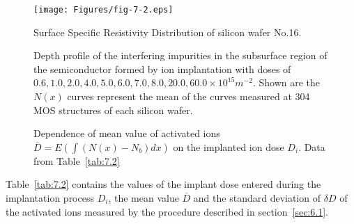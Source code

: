 \begin{figure}[h!]\centering
  \begin{minipage}[c]{\myfiguresize}
    \begin{center}
      \texttt{[image: Figures/fig-7-2.eps]}
    \end{center}
  \caption[Area distribution of surface specific resistance of silicon
    wafer No.16]{Surface Specific Resistivity Distribution of silicon
    wafer No.16.}\label{fig:7.2}
  \end{minipage}
\end{figure}

\newpage
\begin{figure}[h!]\centering
  \begin{minipage}[c]{\myfiguresize}
    \begin{center}
      
    \end{center}
    \caption[Depth profile of tangents]{Depth profile of the
      interfering impurities in the subsurface region of the
      semiconductor formed by ion implantation with doses of $0.6,
      1.0, 2.0, 4.0, 5.0, 6.0, 7.0, 8.0, 20.0, 60.0 \times 10^{15}
      m^{-2}$. Shown are the $N(x)$ curves represent the mean of the
      curves measured at 304 MOS structures of each silicon
      wafer.}\label{fig:7.3}
  \end{minipage}
\end{figure}

\newpage
\begin{figure}[h!]
  \begin{minipage}[c]{\myfiguresize}
    \begin{center}
      
    \end{center}
    \caption[Dependence of mean value of activated ions
      $\overline{D}=E(\int(N(x)-N_{b})dx)$ on the implanted ion dose
      $D_{i}$] {Dependence of mean value of activated ions
      $\overline{D}=E(\int(N(x)-N_{b})dx)$ on the implanted ion dose
      $D_{i}$. Data from Table~\ref{tab:7.2}}\label{fig:7.4}
  \end{minipage}
\end{figure}

Table~\ref{tab:7.2} contains the values of the implant dose entered
during the implantation process $D_{i}$, the mean value $\overline D$
and the standard deviation of $\delta D$ of the activated ions
measured by the procedure described in section~\ref{sec:6.1}.
 
